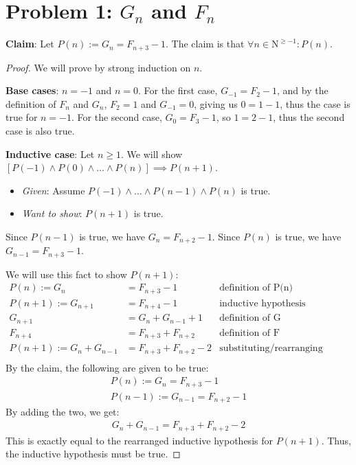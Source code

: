 \documentclass[titlepage]{article}
\begin{document}
 \maketitle

\section{Problem 1: $G_n$ and $F_n$}

\textbf{Claim}: Let $P(n) := G_n = F_{n+3} - 1$.  The claim is that $\forall n \in \mathrm{N}^{\geq -1}: P(n)$.

\begin{proof}
We will prove by strong induction on $n$.

\textbf{Base cases}: $n=-1$ and $n=0$.  For the first case, $G_{-1} = F_{2}-1$, and by the definition of $F_n$ and $G_n$, $F_2 = 1$ and $G_{-1} = 0$, giving us $0 = 1 - 1$, thus the case is true for $n=-1$. For the second case, $G_0 = F_3 - 1$, so $1 = 2 - 1$, thus the second case is also true.


\textbf{Inductive case}: Let $n \geq 1$.  We will show $[P(-1) \land P(0) \land ... \land P(n)] \implies P(n+1)$.
\begin{itemize}
\item \emph{Given}: Assume $P(-1) \land ... \land P(n-1) \land P(n)$ is true.
\item \emph{Want to show}: $P(n+1)$ is true.
\end{itemize}
Since $P(n-1)$ is true, we have
$G_{n} = F_{n+2} - 1$.
Since $P(n)$ is true, we have
$G_{n-1} = F_{n+3} - 1$.

We will use this fact to show $P(n+1)$:
\begin{align*}
P(n) := G_{n} &= F_{n+3} - 1 & \text{definition of P(n)} \\
P(n+1) := G_{n+1} &= F_{n+4} - 1 & \text{inductive hypothesis} \\
G_{n+1} &= G_n + G_{n-1} + 1 & \text{definition of G} \\
F_{n+4} &= F_{n+3} + F_{n+2} & \text{definition of F} \\
P(n+1) := G_n + G_{n-1}&= F_{n+3} + F_{n+2} - 2 & \text{substituting/rearranging terms} \\
\end{align*}
By the claim, the following are given to be true:\\
\begin{align*}
P(n) := G_{n} = F_{n+3} - 1 \\ 
P(n-1) := G_{n-1} = F_{n+2} - 1
\end{align*}
By adding the two, we get:\\
\begin{align*}
G_n + G_{n-1}= F_{n+3} + F_{n+2} - 2
\end{align*}
This is exactly equal to the rearranged inductive hypothesis for $P(n+1)$. Thus, the inductive hypothesis must be true.
\end{proof}
\end{document}
